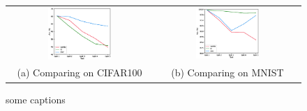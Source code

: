 \documentclass[final]{cvpr}
\begin{document}
\begin{figure}[t]
    \centering
	\begin{tabular}{c@{\hskip0.5cm}c}
		\includegraphics[width=0.45\textwidth]{resources/comp_CIFAR.eps}&%
        \includegraphics[width=0.45\textwidth]{resources/comp_MNIST.eps}\\%
        (a) Comparing on CIFAR100 & (b) Comparing on MNIST\\
	\end{tabular}\vspace{0.2cm}
	\caption{some captions}
	\label{fig:tsne}
\end{figure}


{\small


}
\end{document}
